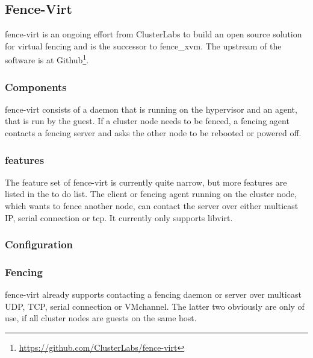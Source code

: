\subsection{Fence-Virt}
fence-virt is an ongoing effort from ClusterLabs to build an open source solution
for virtual fencing and is the successor to fence\_xvm. 
The upstream of the software is at Github\footnote{\url{https://github.com/ClusterLabs/fence-virt}}.
\subsubsection{Components}
fence-virt consists of a daemon that is running on the hypervisor and 
an agent, that is run by the guest. If a cluster node needs to be fenced,
a fencing agent contacts a fencing server and asks the other node to
be rebooted or powered off.
\subsubsection{features}
The feature set of fence-virt is currently quite narrow, but more features are listed
in the to do list.
The client or fencing agent running on the cluster node, which wants to fence
another node, can contact the server over either multicast IP, serial connection or
tcp. It currently only supports libvirt.
\subsubsection{Configuration}
\subsubsection{Fencing}
fence-virt already supports contacting a fencing daemon or server over
multicast UDP, TCP, serial connection or VMchannel. The latter two obviously are only
of use, if all cluster nodes are guests on the same host.

